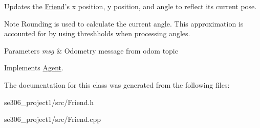 Updates the \hyperlink{classFriend}{Friend}'s x position, y position, and angle to reflect its current pose. 

\begin{DoxyNote}{Note}
Rounding is used to calculate the current angle. This approximation is accounted for by using threshholds when processing angles. 
\end{DoxyNote}

\begin{DoxyParams}{Parameters}
{\em msg} & Odometry message from odom topic \\
\hline
\end{DoxyParams}


Implements \hyperlink{classAgent}{Agent}.



The documentation for this class was generated from the following files\-:\begin{DoxyCompactItemize}
\item 
se306\-\_\-project1/src/Friend.\-h\item 
se306\-\_\-project1/src/Friend.\-cpp\end{DoxyCompactItemize}
